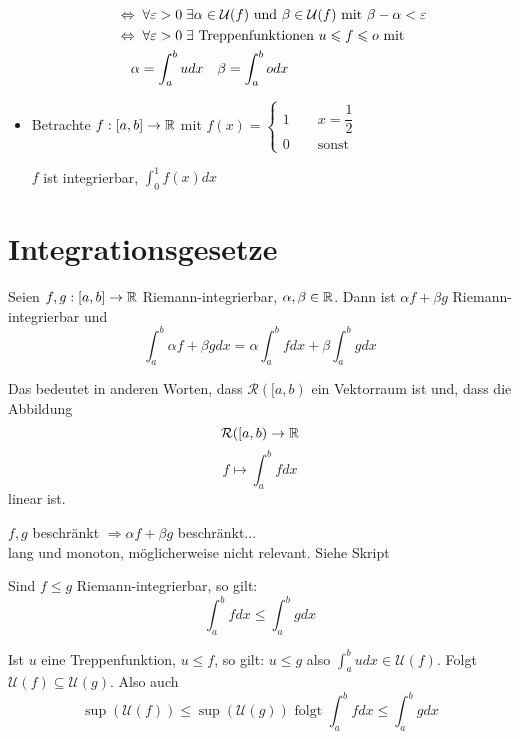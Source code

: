 \documentclass[main.tex]{subfiles}
\begin{document}
\begin{Bemerkung}
\begin{itemize}
$$\begin{aligned}
        &\Leftrightarrow \;\forall \varepsilon > 0 \;\exists \alpha \in \mathcal{U}(f) \text{ und }\beta \in \mathcal{U}(f) \text{ mit } \beta - \alpha < \varepsilon \\
        &\Leftrightarrow \;\forall \varepsilon > 0 \;\exists \text{ Treppenfunktionen } u \leqslant f \leqslant o \text{ mit} \\
        & \quad \alpha = \int_a^b u dx \quad \beta = \int_a^b o dx
      \end{aligned}$$
    \item Betrachte $f:[a,b] \to \mathbb{R}$ mit $f(x) = \left\{ \begin{array}{c}
      1 \qquad x = \dfrac{1}{2} \\
      0 \qquad \text{sonst}
    \end{array}\right.$

    $f$ ist integrierbar, $\int_0^1 f(x) dx$
  \end{itemize}
\end{Bemerkung}


\section{Integrationsgesetze}

\begin{Theorem}
  Seien $f,g:[a,b] \to \mathbb{R}$ Riemann-integrierbar, $\alpha,\beta \in \mathbb{R}$. Dann ist $\alpha f + \beta g$ Riemann-integrierbar und
  $$\int_a^b \alpha f + \beta g dx =  \alpha \int_a^b f dx + \beta \int_a^b g dx$$
\end{Theorem}

\begin{Bemerkung}
  Das bedeutet in anderen Worten, dass $\mathcal{R}([a,b)$ ein Vektorraum ist und, dass die Abbildung
  $$\mathcal{R}([a,b) \to \mathbb{R}$$
  $$f \mapsto \int_a^b fdx$$
  linear ist.
\end{Bemerkung}

\begin{Beweis}
  $f,g$ beschränkt $\Rightarrow \alpha f + \beta g$ beschränkt...\\
  lang und monoton, möglicherweise nicht relevant. Siehe Skript
\end{Beweis}

\begin{Theorem}
  Sind $f \leq g$ Riemann-integrierbar, so gilt:
  $$\int_a^b f dx \leq \int_a^b gdx$$
\end{Theorem}

\begin{Beweis}
  Ist $u$ eine Treppenfunktion, $u \leq f$, so gilt: $u \leq g$ also $\int_a^b u dx \in \mathcal{U}(f)$. Folgt $\mathcal{U}(f) \subseteq \mathcal{U}(g)$. Also auch
  $$\sup(\mathcal{U}(f)) \leq \sup(\mathcal{U}(g)) \text{ folgt } \int_a^b f dx \leq \int_a^b gdx$$
\end{Beweis}
\end{document}
